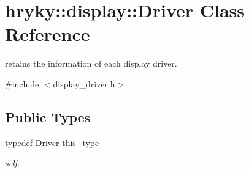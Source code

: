 \hypertarget{classhryky_1_1display_1_1_driver}{\section{hryky\-:\-:display\-:\-:Driver Class Reference}
\label{classhryky_1_1display_1_1_driver}
}


retains the information of each display driver.  




{\ttfamily \#include $<$display\-\_\-driver.\-h$>$}

\subsection*{Public Types}
\begin{DoxyCompactItemize}
\item 
\hypertarget{classhryky_1_1display_1_1_driver_aeed838549fff082eceb3504a3b701fb5}{typedef \hyperlink{classhryky_1_1display_1_1_driver}{Driver} \hyperlink{classhryky_1_1display_1_1_driver_aeed838549fff082eceb3504a3b701fb5}{this\-\_\-type}}\label{classhryky_1_1display_1_1_driver_aeed838549fff082eceb3504a3b701fb5}

\begin{DoxyCompactList}\small\item\em self. \end{DoxyCompactList}\end{DoxyCompactItemize}
